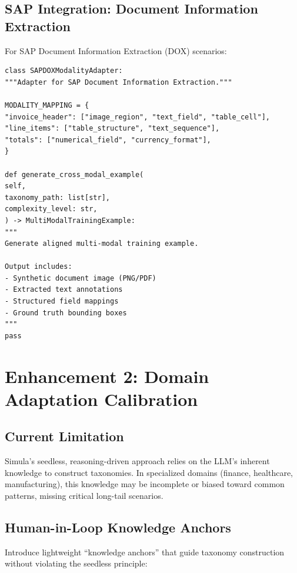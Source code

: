 \documentclass[12pt,a4paper,twoside]{report}
\begin{document}
\subsection{SAP Integration: Document Information Extraction}

For SAP Document Information Extraction (DOX) scenarios:

\begin{lstlisting}[language=jsonx,caption={SAP DOX multi-modal integration.}]
class SAPDOXModalityAdapter:
"""Adapter for SAP Document Information Extraction."""

MODALITY_MAPPING = {
"invoice_header": ["image_region", "text_field", "table_cell"],
"line_items": ["table_structure", "text_sequence"],
"totals": ["numerical_field", "currency_format"],
}

def generate_cross_modal_example(
self,
taxonomy_path: list[str],
complexity_level: str,
) -> MultiModalTrainingExample:
"""
Generate aligned multi-modal training example.

Output includes:
- Synthetic document image (PNG/PDF)
- Extracted text annotations
- Structured field mappings
- Ground truth bounding boxes
"""
pass
\end{lstlisting}


\section{Enhancement 2: Domain Adaptation Calibration}

\subsection{Current Limitation}

Simula's seedless, reasoning-driven approach relies on the LLM's inherent knowledge
to construct taxonomies. In specialized domains (finance, healthcare, manufacturing),
this knowledge may be incomplete or biased toward common patterns, missing critical
long-tail scenarios.

\subsection{Human-in-Loop Knowledge Anchors}

Introduce lightweight ``knowledge anchors'' that guide taxonomy construction without
violating the seedless principle:
\end{document}
